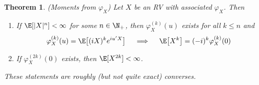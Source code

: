 \documentclass[12pt]{article}
\theoremstyle{plain}
\newtheorem{thm}{Theorem}[section]
\theoremstyle{definition}
\theoremstyle{remark}
\begin{document}
\begin{thm}\emph{(Moments from $\varphi_X$)}
\label{thm:charfcnmoments}
Let $X$ be an RV with associated $\varphi_X$.
Then
\begin{enumerate}[label=\emph{(\roman*)}]
  \item
    If $\E[|X|^n]<\infty$ for some $n\in\N_+$,
    then $\varphi_X^{(k)}(u)$ exists for all $k\leq n$ and
    \begin{align*}
      \varphi^{(k)}_X(u)
      = \E\big[(iX)^k e^{iu'X}\big]
      \quad\implies\quad
      \E\big[X^k\big]
      = (-i)^k \varphi^{(k)}_X(0)
    \end{align*}
  \item
    If $\varphi_X^{(2k)}(0)$ exists, then $\E[X^{2k}]<\infty$.
\end{enumerate}
These statements are roughly (but not quite exact) converses.
\end{thm}
\end{document}
